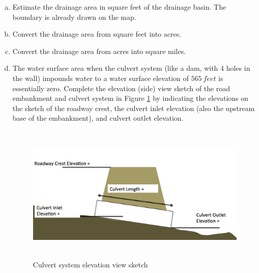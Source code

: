\documentclass[12pt]{article}
\begin{document}
\begin{enumerate}
\begin{enumerate}[a)]
\item Estimate the drainage area in square feet of the drainage basin.   The boundary is already drawn on the map.
~\newline
~\newline
~\newline
~\newline
\item Convert the drainage area from square feet into acres.   
~\newline
~\newline
~\newline
~\newline
\item Convert the drainage area from acres into square miles.   
~\newline
~\newline
~\newline
~\newline
\item The water surface area when the culvert system (like a dam, with 4 holes in the wall) impounds water to a water surface elevation of $565~feet$ is essentially zero.  Complete the elevation (side) view sketch of the road embankment and culvert system in Figure \ref{fig:CulvertSystemElevation} by indicating the elevations on the sketch of the roadway crest, the culvert inlet elevation (also the upstream base of the embankment), and culvert outlet elevation.
\begin{figure}[h!] %
   \centering
   \includegraphics[height=2.6in]{CulvertSystemElevation.jpg} 
   \caption{Culvert system elevation view sketch}
   \label{fig:CulvertSystemElevation}
\end{figure}
\clearpage


\end{enumerate}
\end{enumerate}
\end{document}
